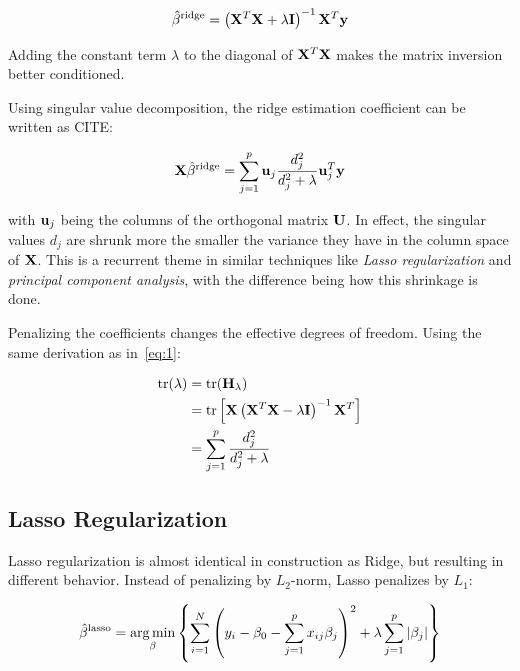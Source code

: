\begin{equation*}
  \hat\beta^{\text{ridge}} = \left( \vb{X}^{T}\vb{X} + \lambda\vb{I} \right)^{-1}\vb{X}^{T}\vb{y}
\end{equation*}

Adding the constant term \(\lambda\) to the diagonal of \(\vb{X}^{T}\vb{X}\) makes
the matrix inversion better conditioned.

Using singular value decomposition, the ridge estimation coefficient can be
written as CITE:

\begin{equation*}
  \vb{X}\hat\beta^{\text{ridge}} = \sum_{j=1}^{p} \vb{u}_{j}\frac{d_{j}^{2}}{d_{j}^{2}+ \lambda}\vb{u}_{j}^{T}\vb{y}
\end{equation*}

with \(\vb{u}_{j}\) being the columns of the orthogonal matrix \(\vb{U}\). In
effect, the singular values \(d_{j}\) are shrunk more the smaller the variance
they have in the column space of \(\vb{X}\). This is a recurrent theme in
similar techniques like \textit{Lasso regularization} and \textit{principal
  component analysis}, with the difference being how this shrinkage is done.

Penalizing the coefficients changes the effective degrees of freedom. Using the
same derivation as in~\eqref{eq:1}:

\begin{align*}
  \text{tr}(\lambda) &= \text{tr}(\vb{H}_{\lambda}) \\
  &= \text{tr}\left[ \vb{X}\left( \vb{X}^{T}\vb{X}  - \lambda \vb{I}\right)^{-1}\vb{X}^{T}\right]\\
                     &= \sum_{j=1}^{p}\frac{d_{j}^{2}}{d_{j}^{2}+\lambda}
\end{align*}

\subsection{Lasso Regularization}\label{subsec:Lasso}
Lasso regularization is almost identical in construction as Ridge, but resulting
in different behavior. Instead of penalizing by \(L_{2}\)-norm, Lasso penalizes by
\(L_{1}\):

\begin{equation*}
  \hat\beta^{\text{lasso}}  = \operatorname*{arg\,min}_{\beta}\left\{ \sum_{i=1}^{N}\left( y_{i} - \beta_{0} - \sum_{j=1}^{p}x_{ij}\beta_{j} \right)^{2} + \lambda\sum_{j=1}^{p}|\beta_{j}| \right\}
\end{equation*}

